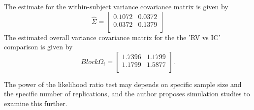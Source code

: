 \documentclass[12pt, a4paper]{report}
\theoremstyle{plain}
\theoremstyle{definition}
\theoremstyle{remark}
\begin{document}
The estimate for the within-subject variance covariance matrix is
given by
\begin{equation}
\hat{\Sigma}= \left[ \begin{array}{cc}
0.1072 & 0.0372  \\
0.0372 & 0.1379  \\
\end{array}\right]
\end{equation}
The estimated overall variance covariance matrix for the the 'RV
vs IC' comparison is given by
\begin{equation}
Block \Omega_{i}= \left[ \begin{array}{cc}
1.7396 & 1.1799  \\
1.1799 & 1.5877  \\
\end{array} \right].
\end{equation}

The power of the
likelihood ratio test may depends on specific sample size and the
specific number of  replications, and the author proposes
simulation studies to examine this further.


\end{document}
